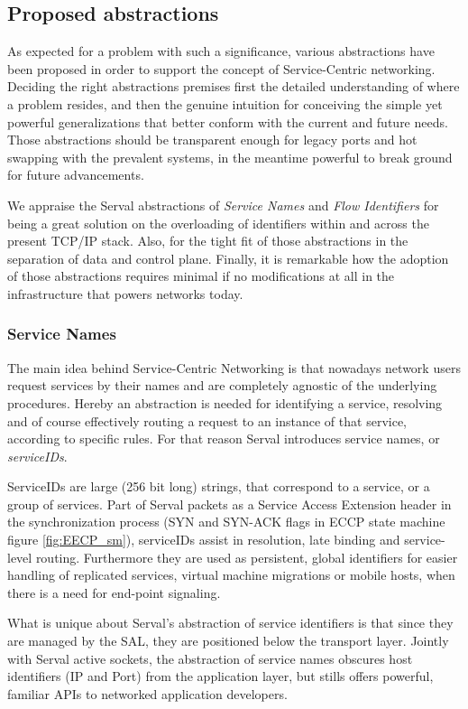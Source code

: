 \subsection{Proposed abstractions}
As expected for a problem with such a significance, various abstractions have been proposed in order to support the concept of Service-Centric networking.
Deciding the right abstractions premises first the detailed understanding of where a problem resides, and then the genuine intuition for conceiving the simple yet powerful generalizations that better conform with the current and future needs.
Those abstractions should be transparent enough for legacy ports and hot swapping with the prevalent systems, in the meantime powerful to break ground for future advancements.

We appraise the Serval abstractions of \emph{Service Names} and \emph{Flow Identifiers} for being a great solution on the overloading of identifiers within and across the present TCP/IP stack.
Also, for the tight fit of those abstractions in the separation of data and control plane.
Finally, it is remarkable how the adoption of those abstractions requires minimal if no modifications at all in the infrastructure that powers networks today.



\subsubsection{Service Names}
The main idea behind Service-Centric Networking is that nowadays network users request services by their names and are completely agnostic of the underlying procedures.
Hereby an abstraction is needed for identifying a service, resolving and of course effectively routing a request to an instance of that service, according to specific rules.
For that reason Serval introduces service names, or \emph{serviceIDs}.

ServiceIDs are large (256 bit long) strings, that correspond to a service, or a group of services.
Part of Serval packets as a Service Access Extension header in the synchronization process (SYN and SYN-ACK flags in ECCP state machine figure \ref{fig:EECP_sm}), serviceIDs assist in resolution, late binding and service-level routing.
Furthermore they are used as persistent, global identifiers for easier handling of replicated services, virtual machine migrations or mobile hosts, when there is a need for end-point signaling.

What is unique about Serval's abstraction of service identifiers is that since they are managed by the SAL, they are positioned below the transport layer.
Jointly with Serval active sockets, the abstraction of service names obscures host identifiers (IP and Port) from the application layer, but stills offers powerful, familiar APIs to networked application developers.


